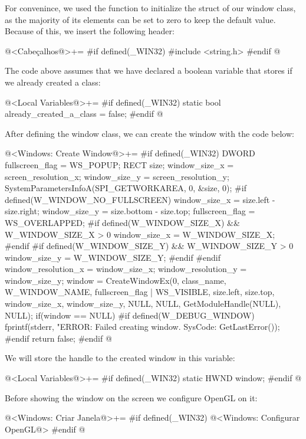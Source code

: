 For convenince, we used the function  to initialize
the struct of our window class, as the majority of its elements can be
set to zero to keep the default value. Because of this, we insert the
following header:

\iniciocodigo
@<Cabeçalhos@>+=
#if defined(_WIN32)
#include <string.h>
#endif
@
\fimcodigo

The code above assumes that we have declared a boolean variable that
stores if we already created a class:

\iniciocodigo
@<Local Variables@>+=
#if defined(_WIN32)
static bool already_created_a_class = false;
#endif
@
\fimcodigo

After defining the window class, we can create the window with the
code below:

\iniciocodigo
@<Windows: Create Window@>+=
#if defined(_WIN32)
{
  DWORD fullscreen_flag = WS_POPUP;
  RECT size;
  window_size_x = screen_resolution_x;
  window_size_y = screen_resolution_y;
  SystemParametersInfoA(SPI_GETWORKAREA, 0, &size, 0);
#if defined(W_WINDOW_NO_FULLSCREEN)
  window_size_x = size.left - size.right;
  window_size_y = size.bottom - size.top;
  fullscreen_flag = WS_OVERLAPPED;
#if defined(W_WINDOW_SIZE_X) && W_WINDOW_SIZE_X > 0
  window_size_x = W_WINDOW_SIZE_X;
#endif
#if defined(W_WINDOW_SIZE_Y) && W_WINDOW_SIZE_Y > 0
  window_size_y = W_WINDOW_SIZE_Y;
#endif
#endif
  window_resolution_x = window_size_x;
  window_resolution_y = window_size_y;
  window = CreateWindowEx(0, class_name,
                          W_WINDOW_NAME,
                          fullscreen_flag | WS_VISIBLE,
                          size.left, size.top, window_size_x,
                          window_size_y,
                          NULL, NULL,
                          GetModuleHandle(NULL),
                          NULL);
  if(window == NULL){
#if defined(W_DEBUG_WINDOW)
    fprintf(stderr, "ERROR: Failed creating window. SysCode: %
            GetLastError());
#endif
    return false;
  }
}
#endif
@
\fimcodigo

We will store the handle to the created window in this variable:

\iniciocodigo
@<Local Variables@>+=
#if defined(_WIN32)
static HWND window;
#endif
@
\fimcodigo

Before showing the window on the screen we configure OpenGL on it:

\iniciocodigo
@<Windows: Criar Janela@>+=
#if defined(_WIN32)
@<Windows: Configurar OpenGL@>
#endif
@
\fimcodigo

